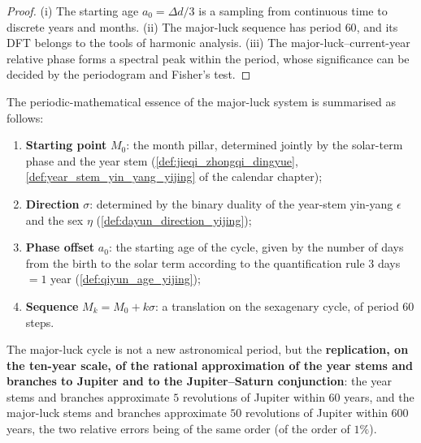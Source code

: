 \begin{proof}
(i) The starting age $a_0=\Delta d/3$ is a sampling from continuous time to discrete years and months. (ii) The major-luck sequence has period $60$, and its DFT belongs to the tools of harmonic analysis. (iii) The major-luck--current-year relative phase forms a spectral peak within the period, whose significance can be decided by the periodogram and Fisher's test.
\end{proof}

\begin{remark}\label{rem:dayun_math_essence_yijing}
The periodic-mathematical essence of the major-luck system is summarised as follows:
\begin{enumerate}[label=(\roman*)]
    \item \textbf{Starting point} $M_0$: the month pillar, determined jointly by the solar-term phase and the year stem (\cref{def:jieqi_zhongqi_dingyue}, \cref{def:year_stem_yin_yang_yijing} of the calendar chapter);
    \item \textbf{Direction} $\sigma$: determined by the binary duality of the year-stem yin-yang $\epsilon$ and the sex $\eta$ (\cref{def:dayun_direction_yijing});
    \item \textbf{Phase offset} $a_0$: the starting age of the cycle, given by the number of days from the birth to the solar term according to the quantification rule $3$ days $=1$ year (\cref{def:qiyun_age_yijing});
    \item \textbf{Sequence} $M_k=M_0+k\sigma$: a translation on the sexagenary cycle, of period $60$ steps.
\end{enumerate}
The major-luck cycle is not a new astronomical period, but the \textbf{replication, on the ten-year scale, of the rational approximation of the year stems and branches to Jupiter and to the Jupiter--Saturn conjunction}: the year stems and branches approximate $5$ revolutions of Jupiter within $60$ years, and the major-luck stems and branches approximate $50$ revolutions of Jupiter within $600$ years, the two relative errors being of the same order (of the order of $1\%$).
\end{remark}

